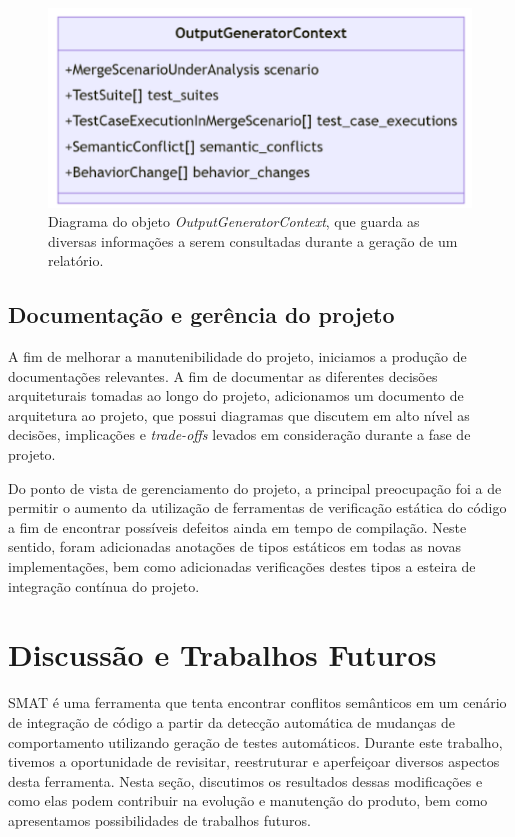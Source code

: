\documentclass[12pt]{article}
\begin{document}
\begin{figure}[H]
    \centering
    \includegraphics{ogc.png}
    \caption{Diagrama do objeto \textit{OutputGeneratorContext}, que guarda as diversas informações a serem consultadas durante a geração de um relatório.}
    \label{fig:ogc}
\end{figure}

\subsection{Documentação e gerência do projeto}
A fim de melhorar a manutenibilidade do projeto, iniciamos a produção de documentações relevantes. A fim de documentar as diferentes decisões arquiteturais tomadas ao longo do projeto, adicionamos um documento de arquitetura ao projeto, que possui diagramas que discutem em alto nível as decisões, implicações e \textit{trade-offs} levados em consideração durante a fase de projeto.

Do ponto de vista de gerenciamento do projeto, a principal preocupação foi a de permitir o aumento da utilização de ferramentas de verificação estática do código a fim de encontrar possíveis defeitos ainda em tempo de compilação. Neste sentido, foram adicionadas anotações de tipos estáticos em todas as novas implementações, bem como adicionadas verificações destes tipos a esteira de integração contínua do projeto.

\section{Discussão e Trabalhos Futuros}
SMAT é uma ferramenta que tenta encontrar conflitos semânticos em um cenário de integração de código a partir da detecção automática de mudanças de comportamento utilizando geração de testes automáticos. Durante este trabalho, tivemos a oportunidade de revisitar, reestruturar e aperfeiçoar diversos aspectos desta ferramenta. Nesta seção, discutimos os resultados dessas modificações e como elas podem contribuir na evolução e manutenção do produto, bem como apresentamos possibilidades de trabalhos futuros.
\end{document}

